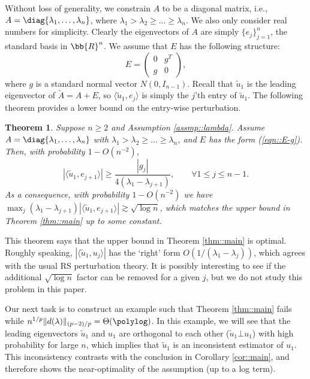 \documentclass[12pt]{article}%
\theoremstyle{plain}%
\newtheorem{thm}{Theorem}[section]
\theoremstyle{remark}
\begin{document}
Without loss of generality, we constrain $A$ to be a diagonal matrix, i.e., $A = \diag \{\lambda_1,\ldots, \lambda_n\}$, where $\lambda_1 > \lambda_2 \ge \ldots \ge \lambda_n$. We also only consider real numbers for simplicity. Clearly the eigenvectors of $A$ are simply $\{e_j\}_{j=1}^n$, the standard basis in $\bb{R}^n$. We assume that $E$ has the following structure:
\begin{equation}\label{eqn::E-g}
E = \left( \begin{array}{cc}
0 & g^T \\ g & 0 \end{array}  \right),
\end{equation}
where $g$ is a standard normal vector $N(0,I_{n-1})$. Recall that $\tilde{u}_1$ is the leading eigenvector of $\tilde{A} = A + E$, so $\langle \tilde{u}_1, e_j \rangle$ is simply the $j$'th entry of $\tilde{u}_1$. The following theorem provides a lower bound on the entry-wise perturbation.
\begin{thm}\label{thm::main2}
Suppose $n \ge 2$ and Assumption \ref{assmp::lambda}. Assume $A = \diag \{\lambda_1,\ldots, \lambda_n\}$ with $\lambda_1 > \lambda_2 \ge \ldots \ge \lambda_n$, and $E$ has the form (\ref{eqn::E-g}). Then, with probability $1 - O(n^{-2})$, 
\begin{equation}
| \langle \tilde{u}_1, e_{j+1} \rangle | \ge \frac{ |g_j| }{4 (\lambda_1 - \lambda_{j+1})}, \qquad \forall  1 \le j \le n-1.
\end{equation}
As a consequence, with probability $1 - O(n^{-2})$ we have $\max_j (\lambda_1 - \lambda_{j+1}) | \langle \tilde{u}_1, e_{j+1} \rangle | \gtrsim \sqrt{\log n}$,  which matches the upper bound in Theorem \ref{thm::main} up to some constant.
\end{thm}

This theorem says that the upper bound in Theorem \ref{thm::main} is optimal. Roughly speaking, $| \langle \tilde{u}_1, u_j \rangle |$ has the `right' form $O(1/(\lambda_1 - \lambda_j))$, which agrees with the usual RS perturbation theory. It is possibly interesting to see if the additional $\sqrt{\log n}$ factor can be removed for a given $j$, but we do not study this problem in this paper.

Our next task is to construct an example such that Theorem \ref{thm::main} fails while $n^{1/p} \| d(\lambda) \|_{(p-2)/p} = \Theta(\polylog)$. In this example, we will see that the leading eigenvectors $\tilde{u}_1$ and $u_1$ are orthogonal to each other ($\tilde{u}_1 \bot u_1$) with high probability for large $n$, which implies that $\tilde{u}_1$ is an inconsistent estimator of $u_1$. This inconsistency contrasts with the conclusion in Corollary \ref{cor::main}, and therefore shows the near-optimality of the assumption (up to a log term).
\end{document}
